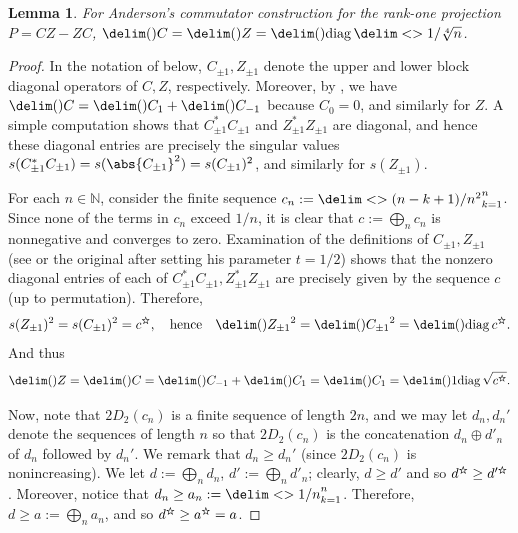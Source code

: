 \documentclass[10pt,reqno]{amsart}
\newtheorem{lemma}[theorem]{Lemma}
\theoremstyle{remark}
\newcommand\openbigstar[1][0.65]{%
  \scalerel*{%
    \stackinset{c}{0pt}{c}{}{\scalebox{#1}{\color{white}{$\bigstar$}}}{%
      $\bigstar$}%
  }{\bigstar}
}
\DeclareMathOperator{\diag}{diag}
\newcommand{\seq}{\delim<>}
\newcommand{\ideal}{\delim()}
\renewcommand{\star}{\openbigstar}
\numberwithin{equation}{section}
\begin{document}
\begin{lemma}
  \label{lem:anderson-ideal}
  For Anderson's commutator construction for the rank-one projection $P = CZ-ZC$, 
  $\ideal{C} = \ideal{Z} = \ideal{\diag\seq{1/\sqrt[4]{n}}}$.
\end{lemma}

\begin{proof}
  In the notation of  below, $C_{\pm 1}, Z_{\pm 1}$ denote the upper and lower block diagonal operators of $C,Z$, respectively.
  Moreover, by , we have $\ideal{C} = \ideal{C_1} + \ideal{C_{-1}}$ because $C_0 = 0$, and similarly for $Z$.
  A simple computation shows that $C_{\pm 1}^{*} C_{\pm 1}$ and $Z_{\pm 1}^{*} Z_{\pm 1}$ are diagonal, and hence these diagonal entries are precisely the singular values $s(C_{\pm 1}^{*} C_{\pm 1}) = s(\abs{C_{\pm 1}}^2) = s(C_{\pm 1})^2$, and similarly for $s(Z_{\pm 1})$.

  For each $n \in \mathbb{N}$, consider the finite sequence $c_n := \seq{(n-k+1)/n^2}_{k=1}^n$.
  Since none of the terms in $c_n$ exceed $1/n$, it is clear that $c := \bigoplus_n c_n$ is nonnegative and converges to zero.
  Examination of the definitions of $C_{\pm 1}, Z_{\pm 1}$ (see \cite[p. 7]{BPW-2014-VLOT} or the original \cite[pp. 129--130]{And-1977-JRAM} after setting his parameter $t = 1/2$) shows that the nonzero diagonal entries of each of $C^{*}_{\pm 1} C_{\pm 1}, Z^{*}_{\pm 1} Z_{\pm 1}$ are precisely given by the sequence $c$ (up to permutation).
  Therefore,
  \begin{equation*}
    s(Z_{\pm 1})^2 = s(C_{\pm 1})^2 = c^{\star},
    \quad\text{hence}\quad
    \ideal{Z_{\pm 1}}^2 = \ideal{C_{\pm 1}}^2 = \ideal{\diag c^{\star}}.
  \end{equation*}
  And thus
  \begin{equation*}
    \ideal{Z} = \ideal{C} = \ideal{C_{-1}} + \ideal{C_1} = \ideal{C_1} = \ideal1{\diag \sqrt{c^{\star}}}.
  \end{equation*}
  
  Now, note that $2 D_2(c_n)$ is a finite sequence of length $2n$, and we may let $d_n, d_n'$ denote the sequences of length $n$ so that $2 D_2(c_n)$ is the concatenation $d_n \oplus d'_n$ of $d_n$ followed by $d_n'$.
  We remark that $d_n \ge d_n'$ (since $2 D_2(c_n)$ is nonincreasing).
  We let $d := \bigoplus_n d_n$, $d' := \bigoplus_n d'_n$;
  clearly, $d \ge d'$ and so $d^{\star} \ge d'^{\star}$.
  Moreover, notice that $d_n \ge a_n := \seq{1/n}_{k=1}^n$.
  Therefore, $d \ge a := \bigoplus_n a_n$, and so $d^{\star} \ge a^{\star} = a$.


\end{proof}
\end{document}
